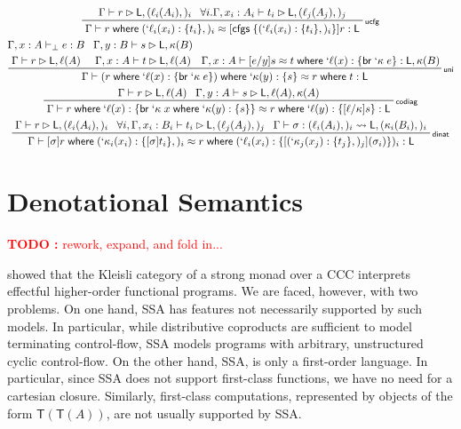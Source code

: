 \documentclass[acmsmall,screen,review]{acmart}
\newcounter{todos}
\newcommand{\TODO}[1]{{
  \stepcounter{todos}
  \begin{center}\large{\textcolor{red}{\textbf{TODO \arabic{todos}:} #1}}\end{center}
}}
\newcommand{\ms}[1]{\ensuremath{\mathsf{#1}}}
\newcommand{\lbl}[1]{{`#1}}
\newcommand{\lto}{:}
\newcommand{\brb}[2]{\ms{br}\;#1\;#2}
\newcommand{\lbrb}[2]{\brb{\lbl{#1}}{#2}}
\newcommand{\where}[2]{#1\;\ms{where}\;#2}
\newcommand{\wbranch}[3]{#1(#2) \lto \{#3\}}
\newcommand{\lwbranch}[3]{\wbranch{\lbl{#1}}{#2}{#3}}
\newcommand{\cfgsubst}[1]{\ms{cfgs}\;\{#1\}}
\newcommand{\bhyp}[2]{#1 : #2}
\newcommand{\lhyp}[2]{#1(#2)}
\newcommand{\rle}[1]{{\scriptsize\textsf{#1}}}
\newcommand{\hasty}[4]{#1 \vdash_{#2} #3: {#4}}
\newcommand{\haslb}[3]{#1 \vdash #2 \rhd #3}
\newcommand{\lbsubst}[4]{#1 \vdash #2: #3 \rightsquigarrow #4}
\newcommand{\teqv}{\approx}
\newcommand{\lbeq}[4]{#1 \vdash #2 \teqv #3 : {#4}}
\begin{document}
\begin{gather*}
  \prftree[r]{\rle{ucfg}}
    {\haslb{\Gamma}{r}{\ms{L}, (\lhyp{\ell_i}{A_i},)_i}}
    {\forall i. \haslb{\Gamma, \bhyp{x_i}{A_i}}{t_i}{\ms{L}, (\lhyp{\ell_j}{A_j},)_j}}
    {
      \lbeq{\Gamma}
        {\where{r}{(\lwbranch{\ell_i}{x_i}{t_i},)_i}}
        {[\cfgsubst{(\lwbranch{\ell_i}{x_i}{t_i},)_i}]r}
        {\ms{L}}
    }
  \\
  \prftree[r]{\rle{uni}}
    {
      \prfStackPremises
      {\hasty{\Gamma, \bhyp{x}{A}}{\bot}{e}{B}}
      {\haslb{\Gamma}{r}{\ms{L}, \ell(A)}}
    }
    {
      \prfStackPremises
      {\haslb{\Gamma, \bhyp{y}{B}}{s}{\ms{L}, \kappa(B)}}
      {\haslb{\Gamma, \bhyp{x}{A}}{t}{\ms{L}, \ell(A)}}
    }
    {
      \lbeq{\Gamma, \bhyp{x}{A}}
        {[e/y]s}
        {\where{t}{\lwbranch{\ell}{x}{\lbrb{\kappa}{e}}}}
        {\ms{L}, \kappa(B)}
    }
    {
      \lbeq{\Gamma}
        {\where{(\where{r}{\lwbranch{\ell}{x}{\lbrb{\kappa}{e}}})}
          {\lwbranch{\kappa}{y}{s}}}
        {\where{r}{t}}
        {\ms{L}}
    }
  \\
  \prftree[r]{\rle{codiag}}
    {\haslb{\Gamma}{r}{\ms{L}, \ell(A)}}
    {\haslb{\Gamma, \bhyp{y}{A}}{s}{\ms{L}, \ell(A), \kappa(A)}}
    {\lbeq{\Gamma}{\where{r}{\lwbranch{\ell}{x}{\where{\lbrb{\kappa}{x}}
      {\lwbranch{\kappa}{y}{s}}}}}
    {\where{r}{\lwbranch{\ell}{y}{[\ell/\kappa]s}}}
    {\ms{L}}}
  \\
  \prftree[r]{\rle{dinat}}
  {\haslb{\Gamma}{r}{\ms{L}, (\lhyp{\ell_i}{A_i},)_i}}
  {\forall i, \haslb{\Gamma, \bhyp{x_i}{B_i}}
    {t_i}
    {\ms{L}, (\lhyp{\ell_j}{A_j},)_j}}
  {\lbsubst{\Gamma}{\sigma}{(\lhyp{\ell_i}{A_i},)_i}{\ms{L}, (\lhyp{\kappa_i}{B_i},)_i}}
  {\lbeq{\Gamma}
    {\where{[\sigma]r}
      {(\lwbranch{\kappa_i}{x_i}{[\sigma]t_i},)_i}}
    {\where{r}{(\lwbranch{\ell_{i}}{x_i}{[(\lwbranch{\kappa_j}{x_j}{t_j},)_j](\sigma_i)})_i}}
    {\ms{L}}}
\end{gather*}

\section{Denotational Semantics}

\TODO{rework, expand, and fold in...}

\citet{moggi-91-monad} showed that the Kleisli category of a strong monad over a CCC interprets
effectful higher-order functional programs. We are faced, however, with two problems. On one hand,
SSA has features not necessarily supported by such models. In particular, while distributive
coproducts are sufficient to model terminating control-flow, SSA models programs with arbitrary,
unstructured cyclic control-flow. On the other hand, SSA, is only a first-order language. In
particular, since SSA does not support first-class functions, we have no need for a cartesian
closure. Similarly, first-class computations, represented by objects of the form
$\ms{T}(\ms{T}(A))$, are not usually supported by SSA.
\end{document}
